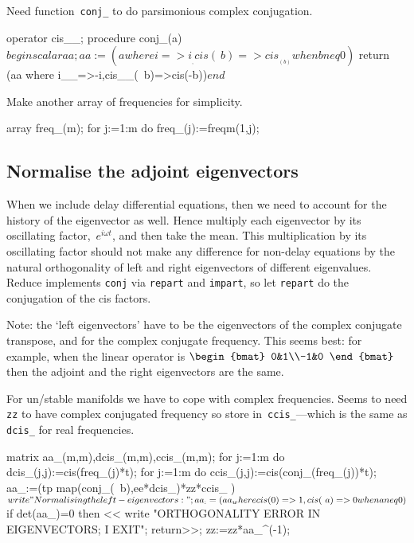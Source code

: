 \documentclass[11pt,a5paper]{article}
\begin{document}
Need function~\verb|conj_| to do parsimonious complex conjugation.
\begin{reduce}
operator cis__;
procedure conj_(a)$ begin scalar aa;
    aa:=(a where {i=>i__, cis(~b)=>cis__(b) when b neq 0})$
    return (aa where {i__=>-i,cis__(~b)=>cis(-b)})$
    end$
\end{reduce}

Make another array of frequencies for simplicity.
\begin{reduce}
array freq_(m);
for j:=1:m do freq_(j):=freqm(1,j);
\end{reduce}



\subsection{Normalise the adjoint eigenvectors}
When we include delay differential equations, then we need to account for the history of the eigenvector as well.
Hence multiply each eigenvector by its oscillating factor,~\(e^{i\omega t}\), and then take the mean.
This multiplication by its oscillating factor should not make any difference for non-delay equations by the natural orthogonality of left and right eigenvectors of different eigenvalues.
Reduce implements \verb|conj| via \verb|repart| and \verb|impart|, so let \verb|repart| do the conjugation of the cis factors.

Note: the `left eigenvectors' have to be the eigenvectors of the complex conjugate transpose, and for the complex conjugate frequency.
This seems best: for example, when the linear operator is \(\begin{bmat} 0&1\\-1&0 \end{bmat}\) then the adjoint and the right eigenvectors are the same.

For un/stable manifolds we have to cope with complex frequencies.  
Seems to need \verb|zz| to have complex conjugated frequency so store in~\verb|ccis_|---which is the same as \verb|dcis_| for real frequencies.

\begin{reduce}
matrix aa_(m,m),dcis_(m,m),ccis_(m,m);
for j:=1:m do dcis_(j,j):=cis(freq_(j)*t);
for j:=1:m do ccis_(j,j):=cis(conj_(freq_(j))*t);
aa_:=(tp map(conj_(~b),ee*dcis_)*zz*ccis_ )$
write "Normalising the left-eigenvectors:";
aa_:=(aa_ where {cis(0)=>1, cis(~a)=>0 when a neq 0})$
if det(aa_)=0 then << write
    "ORTHOGONALITY ERROR IN EIGENVECTORS; I EXIT"; 
    return>>;
zz:=zz*aa_^(-1);
\end{reduce}
\end{document}
